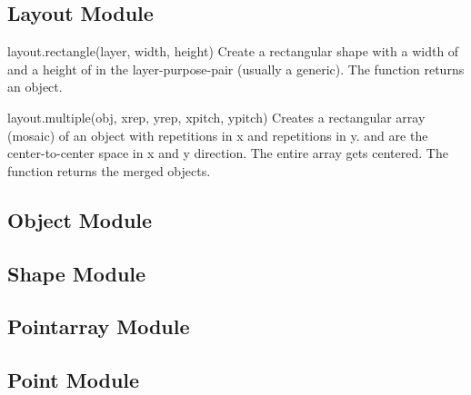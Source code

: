 \subsection{Layout Module}
\begin{apifunc}{layout.rectangle(layer, width, height)} 
    Create a rectangular shape with a width of  and a height of  in the layer-purpose-pair  (usually a generic). The function
    returns an object.
\end{apifunc}
\begin{apifunc}{layout.multiple(obj, xrep, yrep, xpitch, ypitch)} 
    Creates a rectangular array (mosaic) of an object with  repetitions in x and  repetitions in y.  and  are the
    center-to-center space in x and y direction. The entire array gets centered. The function returns the merged objects.
\end{apifunc}
\subsection{Object Module}
\subsection{Shape Module}
\subsection{Pointarray Module}
\subsection{Point Module}


